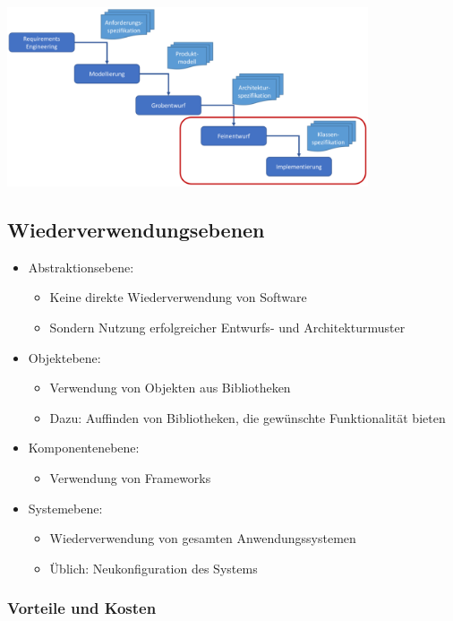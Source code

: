 \documentclass[11pt, a4paper]{article}
\begin{document}
\centering \includegraphics[width=0.8\textwidth]{Feindesign-01.png}

\raggedright \subsection{Wiederverwendungsebenen}

\begin{itemize}
    \item Abstraktionsebene:
    \begin{itemize}
        \item Keine direkte Wiederverwendung von Software
        \item Sondern Nutzung erfolgreicher Entwurfs- und Architekturmuster
    \end{itemize}
    \item Objektebene:
    \begin{itemize}
        \item Verwendung von Objekten aus Bibliotheken
        \item Dazu: Auffinden von Bibliotheken, die gewünschte Funktionalität bieten
    \end{itemize}
    \item Komponentenebene:
    \begin{itemize}
        \item Verwendung von Frameworks
    \end{itemize}
    \item Systemebene:
    \begin{itemize}
        \item Wiederverwendung von gesamten Anwendungssystemen
        \item Üblich: Neukonfiguration des Systems
    \end{itemize}
\end{itemize}


\raggedright \subsubsection{Vorteile und Kosten}
\end{document}
